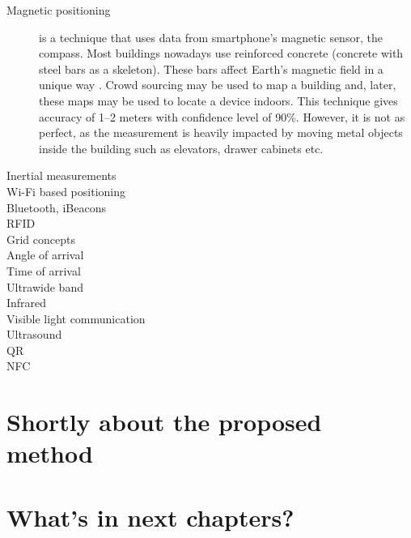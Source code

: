 \begin{description}
	\item[Magnetic positioning] is a technique that uses data from smartphone's magnetic sensor, the compass. Most buildings nowadays use reinforced concrete (concrete with steel bars as a skeleton). These bars affect Earth's magnetic field in a unique way \cite{Haverinen:magnetic}. Crowd sourcing may be used to map a building and, later, these maps may be used to locate a device indoors. This technique gives accuracy of 1--2 meters with confidence level of 90\%. However, it is not as perfect, as the measurement is heavily impacted by moving metal objects inside the building such as elevators, drawer cabinets etc.
	
	\item[Inertial measurements]
	
	\item[Wi-Fi based positioning]
	
	\item[Bluetooth, iBeacons]
	
	\item[RFID]
	
	\item[Grid concepts]
	
	\item[Angle of arrival]
	
	\item[Time of arrival]
	
	\item[Ultrawide band]

	\item[Infrared]
	
	\item[Visible light communication]
	
	\item[Ultrasound]
	
	\item[QR]
	
	\item[NFC]
\end{description}

\section{Shortly about the proposed method}

\section{What's in next chapters?}